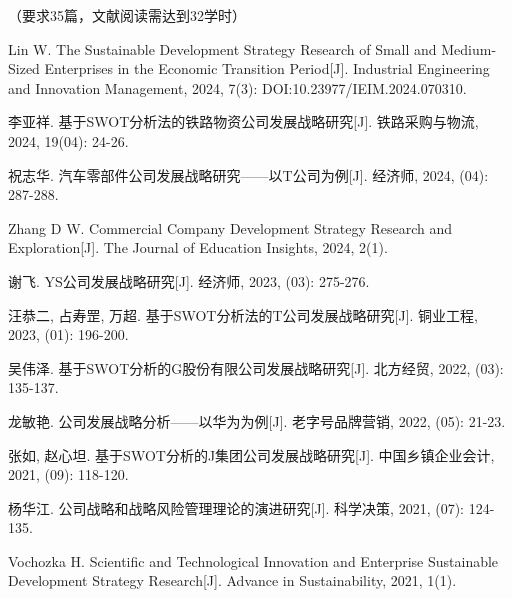 \documentclass[UTF8, a4paper, 11pt]{ctexart}
\begin{document}
\begin{UnifiedBox}[height=25.4cm]
\setlength{\parindent}{0em}
\setlength{\leftmargini}{1.5em}

\noindent （要求35篇，文献阅读需达到32学时）

\vspace{0.3cm}

\begin{enumerate}[label={[}\arabic*{]}, leftmargin=2em, itemsep=0.15em, parsep=0pt]

\item Lin W. The Sustainable Development Strategy Research of Small and Medium-Sized Enterprises in the Economic Transition Period[J]. Industrial Engineering and Innovation Management, 2024, 7(3): DOI:10.23977/IEIM.2024.070310.

\item 李亚祥. 基于SWOT分析法的铁路物资公司发展战略研究[J]. 铁路采购与物流, 2024, 19(04): 24-26.

\item 祝志华. 汽车零部件公司发展战略研究——以T公司为例[J]. 经济师, 2024, (04): 287-288.

\item Zhang D W. Commercial Company Development Strategy Research and Exploration[J]. The Journal of Education Insights, 2024, 2(1).

\item 谢飞. YS公司发展战略研究[J]. 经济师, 2023, (03): 275-276.

\item 汪恭二, 占寿罡, 万超. 基于SWOT分析法的T公司发展战略研究[J]. 铜业工程, 2023, (01): 196-200.

\item 吴伟泽. 基于SWOT分析的G股份有限公司发展战略研究[J]. 北方经贸, 2022, (03): 135-137.

\item 龙敏艳. 公司发展战略分析——以华为为例[J]. 老字号品牌营销, 2022, (05): 21-23.

\item 张如, 赵心坦. 基于SWOT分析的J集团公司发展战略研究[J]. 中国乡镇企业会计, 2021, (09): 118-120.

\item 杨华江. 公司战略和战略风险管理理论的演进研究[J]. 科学决策, 2021, (07): 124-135.

\item Vochozka H. Scientific and Technological Innovation and Enterprise Sustainable Development Strategy Research[J]. Advance in Sustainability, 2021, 1(1).


\end{enumerate}
\end{UnifiedBox}
\end{document}
